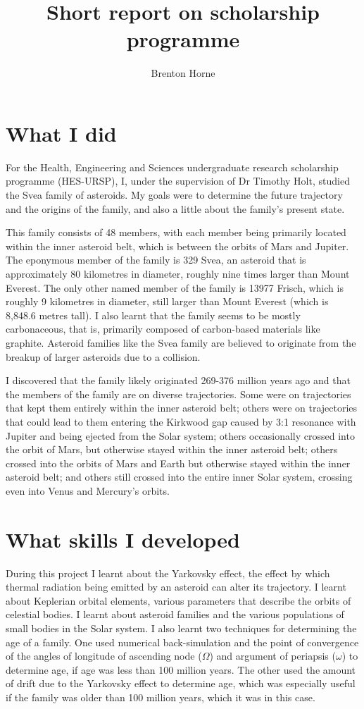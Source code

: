 \documentclass[12pt,a4paper,openright]{article}
\title{Short report on scholarship programme}
\author{Brenton Horne}
\begin{document}
\maketitle

\section{What I did}
For the Health, Engineering and Sciences undergraduate research scholarship programme (HES-URSP), I, under the supervision of Dr Timothy Holt, studied the Svea family of asteroids. My goals were to determine the future trajectory and the origins of the family, and also a little about the family's present state. 

This family consists of 48 members, with each member being primarily located within the inner asteroid belt, which is between the orbits of Mars and Jupiter. The eponymous member of the family is 329 Svea, an asteroid that is approximately 80 kilometres in diameter, roughly nine times larger than Mount Everest. The only other named member of the family is 13977 Frisch, which is roughly 9 kilometres in diameter, still larger than Mount Everest (which is 8,848.6 metres tall). I also learnt that the family seems to be mostly carbonaceous, that is, primarily composed of carbon-based materials like graphite. Asteroid families like the Svea family are believed to originate from the breakup of larger asteroids due to a collision. 

I discovered that the family likely originated 269-376 million years ago and that the members of the family are on diverse trajectories. Some were on trajectories that kept them entirely within the inner asteroid belt; others were on trajectories that could lead to them entering the Kirkwood gap caused by 3:1 resonance with Jupiter and being ejected from the Solar system; others occasionally crossed into the orbit of Mars, but otherwise stayed within the inner asteroid belt; others crossed into the orbits of Mars and Earth but otherwise stayed within the inner asteroid belt; and others still crossed into the entire inner Solar system, crossing even into Venus and Mercury's orbits. 

\section{What skills I developed}
During this project I learnt about the Yarkovsky effect, the effect by which thermal radiation being emitted by an asteroid can alter its trajectory. I learnt about Keplerian orbital elements, various parameters that describe the orbits of celestial bodies. I learnt about asteroid families and the various populations of small bodies in the Solar system. I also learnt two techniques for determining the age of a family. One used numerical back-simulation and the point of convergence of the angles of longitude of ascending node ($\Omega$) and argument of periapsis ($\omega$) to determine age, if age was less than 100 million years. The other used the amount of drift due to the Yarkovsky effect to determine age, which was especially useful if the family was older than 100 million years, which it was in this case. 
\end{document}
